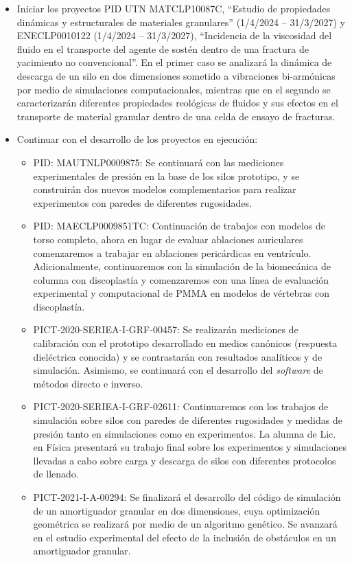 \documentclass[a4paper,11pt,twoside,final,titlepage,onecolumn,openright]{report}
\begin{document}
\begin{itemize}
\item Iniciar los proyectos PID UTN MATCLP10087C, ``Estudio de propiedades dinámicas y estructurales de materiales granulares'' (1/4/2024 -- 31/3/2027) y ENECLP0010122 (1/4/2024 -- 31/3/2027), ``Incidencia de la viscosidad del fluido en el transporte del agente de sostén dentro de una fractura de yacimiento no convencional''. En el primer caso se analizará la dinámica de descarga de un silo en dos dimensiones sometido a vibraciones bi-armónicas por medio de simulaciones computacionales, mientras que en el segundo se caracterizarán diferentes propiedades reológicas de fluidos y sus efectos en el transporte de material granular dentro de una celda de ensayo de fracturas.
\item Continuar con el desarrollo de los proyectos en ejecución:
    \begin{itemize}
\item PID: MAUTNLP0009875: Se continuará con las mediciones experimentales de presión en la base de los silos prototipo, y se construirán dos nuevos modelos complementarios para realizar experimentos con paredes de diferentes rugosidades. 
\item PID: MAECLP0009851TC: Continuación de trabajos con modelos de torso completo, ahora en lugar de evaluar ablaciones auriculares comenzaremos a trabajar en ablaciones pericárdicas en ventrículo. Adicionalmente, continuaremos con la simulación de la biomecánica de columna con discoplastía y comenzaremos con una línea de evaluación experimental y computacional de PMMA en modelos de vértebras con discoplastía.
\item PICT-2020-SERIEA-I-GRF-00457: Se realizarán mediciones de calibración con el prototipo desarrollado en medios canónicos (respuesta dieléctrica conocida) y se contrastarán con resultados analíticos y de simulación. Asimismo, se continuará con el desarrollo del \textit{software} de métodos directo e inverso.
\item PICT-2020-SERIEA-I-GRF-02611: Continuaremos con los trabajos de simulación sobre silos con paredes de diferentes rugosidades y medidas de presión tanto en simulaciones como en experimentos. La alumna de Lic. en Física presentará su trabajo final sobre los experimentos y simulaciones llevadas a cabo sobre carga y descarga de silos con diferentes protocolos de llenado.
\item PICT-2021-I-A-00294: Se finalizará el desarrollo del código de simulación de un amortiguador granular en dos dimensiones, cuya optimización geométrica se realizará por medio de un algoritmo genético. Se avanzará en el estudio experimental del efecto de la inclusión de obstáculos en un amortiguador granular. 

\end{itemize}
\end{itemize}
\end{document}

